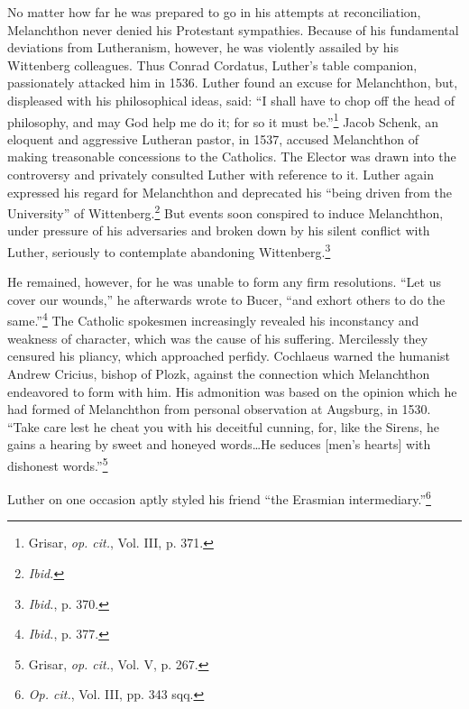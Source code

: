 No matter how far he was prepared to go in his attempts at reconciliation,
Melanchthon never denied his Protestant sympathies.
Because of his fundamental deviations from Lutheranism, however,
he was violently assailed by his Wittenberg colleagues. Thus Conrad
Cordatus, Luther’s table companion, passionately attacked him in
1536. Luther found an excuse for Melanchthon, but, displeased with
his philosophical ideas, said: “I shall have to chop off the head of philosophy,
and may God help me do it; for so it must be.”\footnote{Grisar, \textit{op. cit.}, Vol. III, p. 371.}
 Jacob
Schenk, an eloquent and aggressive Lutheran pastor, in 1537, accused
Melanchthon of making treasonable concessions to the Catholics. The
Elector was drawn into the controversy and privately consulted
Luther with reference to it. Luther again expressed his regard for
Melanchthon and deprecated his “being driven from the University”
of Wittenberg.\footnote{\textit{Ibid.}}
 But events soon conspired to induce Melanchthon,
under pressure of his adversaries and broken down by his silent conflict
with Luther, seriously to contemplate abandoning Wittenberg.\footnote{\textit{Ibid.}, p. 370.}

He remained, however, for he was unable to form any firm resolutions.
“Let us cover our wounds,” he afterwards wrote to Bucer, “and
exhort others to do the same.”\footnote{\textit{Ibid.}, p. 377.}
The Catholic spokesmen increasingly
revealed his inconstancy and weakness of character, which was the
cause of his suffering. Mercilessly they censured his pliancy, which
approached perfidy. Cochlaeus warned the humanist Andrew Cricius,
bishop of Plozk, against the connection which Melanchthon endeavored to
form with him. His admonition was based on the opinion
which he had formed of Melanchthon from personal observation at
Augsburg, in 1530. “Take care lest he cheat you with his deceitful
cunning, for, like the Sirens, he gains a hearing by sweet and honeyed
words\dots He seduces [men’s hearts] with dishonest words.”\footnote{Grisar, \textit{op. cit.}, Vol. V, p. 267.}

Luther on one occasion aptly styled his friend “the Erasmian intermediary.”\footnote{\textit{Op. cit.}, Vol. III, pp. 343 sqq.}

